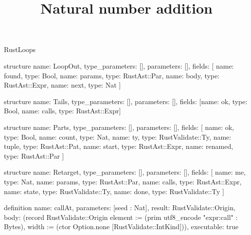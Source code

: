 \begin{lexlean}{RustLoops}
\title{Natural number addition}
\begin{semanticmodule}
structure{
  name: LoopOut,
  type_parameters: [],
  parameters: [],
  fields: [
    {name: found, type: Bool},
    {name: params, type: RustAst::Par},
    {name: body, type: RustAst::Expr},
    {name: next, type: Nat}
  ]
}

structure{
  name: Tails,
  type_parameters: [],
  parameters: [],
  fields: [{name: ok, type: Bool}, {name: calls, type: RustAst::Expr}]
}

structure{
  name: Parts,
  type_parameters: [],
  parameters: [],
  fields: [
    {name: ok, type: Bool},
    {name: count, type: Nat},
    {name: ty, type: RustValidate::Ty},
    {name: tuple, type: RustAst::Pat},
    {name: start, type: RustAst::Expr},
    {name: renamed, type: RustAst::Par}
  ]
}

structure{
  name: Retarget,
  type_parameters: [],
  parameters: [],
  fields: [
    {name: me, type: Nat},
    {name: params, type: RustAst::Par},
    {name: calls, type: RustAst::Expr},
    {name: state, type: RustValidate::Ty},
    {name: done, type: RustValidate::Ty}
  ]
}

definition{
  name: callAt,
  parameters: [seed : Nat],
  result: RustValidate::Origin,
  body: (record RustValidate::Origin {element := (prim utf8_encode "expr:call" : Bytes), width := (ctor Option.none [RustValidate::IntKind])}),
  executable: true
}


\end{semanticmodule}
\end{lexlean}
